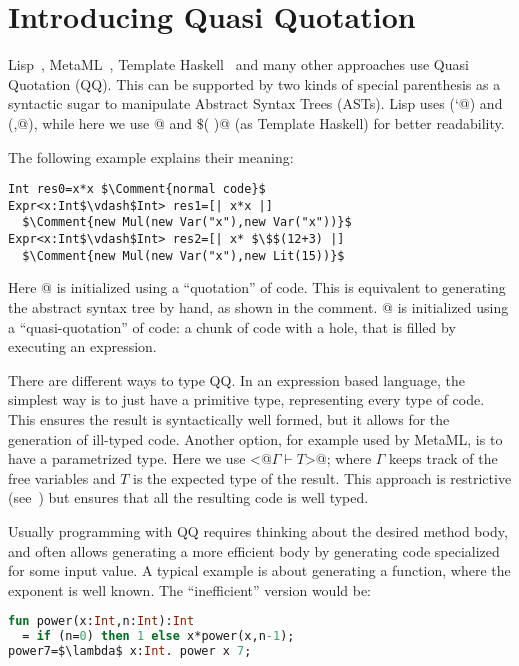 
\section{Introducing Quasi Quotation}

Lisp~\cite{pitman1980special}, MetaML~\cite{moggi1999idealized}, Template Haskell~\cite{sheard2002template} and many other approaches use Quasi Quotation (QQ).
This can be supported by two kinds of special parenthesis as a syntactic sugar to manipulate Abstract Syntax Trees (ASTs).
Lisp uses (\Q@`@) and (\Q@,@), while here we use
\Q@[|  |]@  and \Q@$\$$(  )@ (as Template Haskell) 
for better readability.

The following example explains their meaning: 

\begin{lstlisting}
Int res0=x*x $\Comment{normal code}$
Expr<x:Int$\vdash$Int> res1=[| x*x |]
  $\Comment{new Mul(new Var("x"),new Var("x"))}$
Expr<x:Int$\vdash$Int> res2=[| x* $\$$(12+3) |]
  $\Comment{new Mul(new Var("x"),new Lit(15))}$
\end{lstlisting}

Here @ is initialized using a ``quotation'' of code.
This is equivalent to generating the abstract syntax tree by hand, as shown in the comment.
@ is initialized using a ``quasi-quotation'' of code: a chunk of code with a hole, that is filled by executing an expression.

There are different ways to type QQ.
In an expression based language, 
the simplest way is to just have a primitive \Q@Expr@ type,
representing every type of code.
This ensures the result is syntactically well formed, but
it allows for the generation of ill-typed code.
Another option, for example used by MetaML,
is to have a parametrized type.
Here we use \Q@Expr<@$\Gamma\vdash T$\Q@>@; where
$\Gamma$ keeps track of the free variables and $T$ is the expected type
of the result.
This approach is restrictive (see~\cite{servetto2014meta})
 but ensures that all the resulting code is well typed.

Usually programming with QQ requires thinking about the desired method body,
 and often allows generating a more efficient body by generating code specialized for some input value.
A typical example is about generating a \Q@pow@ function, where the exponent is well known.
The ``inefficient'' version would be:

\begin{lstlisting}[language=ML]
fun power(x:Int,n:Int):Int 
  = if (n=0) then 1 else x*power(x,n-1);
power7=$\lambda$ x:Int. power x 7;
\end{lstlisting}

